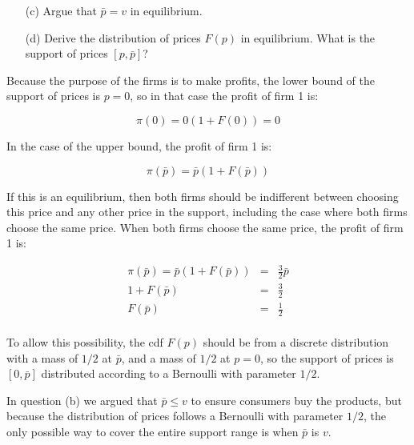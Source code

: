 
\begin{tcolorbox}
    \begin{enumerate}
        \item[(c)] Argue that $\bar{p} = v$ in equilibrium.
        \item[(d)] Derive the distribution of prices $F(p)$ in equilibrium. What is the support of prices $[p, \bar{p}]$?
    \end{enumerate}
\end{tcolorbox}

Because the purpose of the firms is to make profits, the lower bound of the support of prices is $p = 0$, so in that case the profit of firm 1 is:

\begin{equation*}
    \pi(0) = 0 \left(1 +  F(0) \right) = 0
\end{equation*}

In the case of the upper bound, the profit of firm 1 is:

\begin{equation*}
    \pi(\bar{p}) = \bar{p} \left(1 +  F(\bar{p}) \right)
\end{equation*}

If this is an equilibrium, then both firms should be indifferent between choosing this price and any other price in the support, including the case where both firms choose the same price. When both firms choose the same price, the profit of firm 1 is:

\begin{eqnarray*}
    \pi(\bar{p}) = \bar{p} \left(1 +  F(\bar{p}) \right) &=& \frac{3}{2} \bar{p}\\
    1 +  F(\bar{p}) &=& \frac{3}{2}\\
    F(\bar{p}) &=& \frac{1}{2}\\
\end{eqnarray*}

\begin{myanswerbox}[Answer to (d)]
    To allow this possibility, the cdf $F(p)$ should be from a discrete distribution with a mass of $1/2$ at $\bar{p}$, and a mass of $1/2$ at $p = 0$, so the support of prices is $[0, \bar{p}]$ distributed according to a Bernoulli with parameter $1/2$.
\end{myanswerbox}

\begin{myanswerbox}[Answer to (c)]
    In question (b) we argued that \( \bar{p} \leq v \) to ensure consumers buy the products, but because the distribution of prices follows a Bernoulli with parameter \( 1/2 \), the only possible way to cover the entire support range is when \( \bar{p} \) is \( v \).
\end{myanswerbox}
